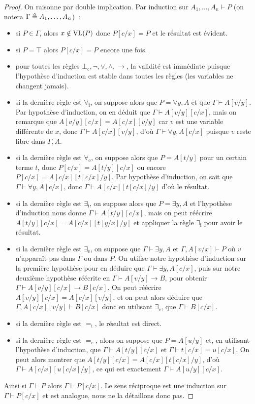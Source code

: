\begin{proof}
  On raisonne par double implication. Par induction sur
  $A_1,\ldots,A_n\vdash P$ (on notera $\Gamma \triangleq A_1,\ldots,A_n$)~:
  \begin{itemize}
  \item si $P\in \Gamma$, alors $x\notin\operatorname{VL}(P)$ donc $P[c/x]=P$ et
    le résultat est évident.
  \item si $P = \top$ alors $P[c/x]=P$ encore une fois.
  \item pour toutes les règles $\bot_\mathrm c,\lnot,\lor,\land,\to$, la
    validité est immédiate puisque l'hypothèse d'induction est stable dans
    toutes les règles (les variables ne changent jamais).
  \item si la dernière règle est $\forall_\mathrm i$, on suppose alors que
    $P = \forall y, A$ et que $\Gamma\vdash A[v/y]$. Par hypothèse d'induction,
    on en déduit que $\Gamma\vdash A[v/y][c/x]$, mais on remarque que
    $A[v/y][c/x] = A[c/x][v/y]$ car $v$ est une variable différente de $x$,
    donc $\Gamma\vdash A[c/x][v/y]$, d'où $\Gamma\vdash \forall y, A[c/x]$
    puisque $v$ reste libre dans $\Gamma,A$.
  \item si la dernière règle est $\forall_\mathrm e$, on suppose alors que
    $P = A[t/y]$ pour un certain terme $t$, donc $P[c/x] = A[t/y][c/x]$ ou
    encore $P[c/x] = A[c/x][t[c/x]/y]$. Par hypothèse d'induction, on sait que
    $\Gamma\vdash \forall y, A[c/x]$, donc $\Gamma\vdash A[c/x][t[c/x]/y]$
    d'où le résultat.
  \item si la dernière règle est $\exists_\mathrm i$, on suppose alors que
    $P = \exists y, A$ et l'hypothèse d'induction nous donne
    $\Gamma\vdash A[t/y][c/x]$, mais on peut réécrire
    $A[t/y][c/x] = A[c/x][t[y/x]/y]$ et appliquer la règle $\exists_\mathrm i$
    pour avoir le résultat.
  \item si la dernière règle est $\exists_\mathrm e$, on suppose que
    $\Gamma\vdash \exists y, A$ et $\Gamma, A[v/x]\vdash P$ où $v$ n'apparaît
    pas dans $\Gamma$ ou dans $P$. On utilise notre hypothèse d'induction sur
    la première hypothèse pour en déduire que $\Gamma\vdash \exists y, A[c/x]$,
    puis sur notre deuxième hypothèse réécrite en $\Gamma\vdash A[v/y]\to B$,
    pour obtenir $\Gamma\vdash A[v/y][c/x]\to B[c/x]$. On peut réécrire
    $A[v/y][c/x] = A[c/x][v/y]$, et on peut alors déduire que
    $\Gamma,A[c/x][v/y]\vdash B[c/x]$ donc en utilisant $\exists_\mathrm e$, que
    $\Gamma\vdash B[c/x]$.
  \item si la dernière règle est $=_\mathrm i$, le résultat est direct.
  \item si la dernière règle est $=_\mathrm e$, alors on suppose que $P = A[u/y]$
    et, en utilisant l'hypothèse d'induction, que $\Gamma\vdash A[t/y][c/x]$
    et $\Gamma\vdash t[c/x] = u[c/x]$. On peut alors montrer que
    $A[t/y][c/x] = A[c/x][t[c/x]/y]$, d'où $\Gamma\vdash A[c/x][u[c/x]/y]$, ce
    qui est exactement $\Gamma\vdash A[u/y][c/x]$.
  \end{itemize}
  Ainsi si $\Gamma\vdash P$ alors $\Gamma\vdash P[c/x]$. Le sens réciproque est
  une induction sur $\Gamma\vdash P[c/x]$ et est analogue, nous ne la détaillons
  donc pas.
\end{proof}

